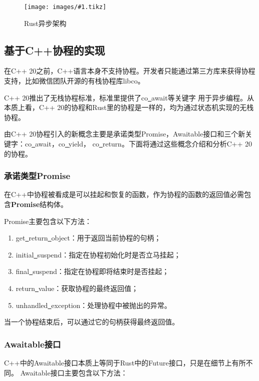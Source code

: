 \documentclass[supercite]{HustGraduPaper}
\newcommand{\cfig}[3]{
  \begin{figure}[htb]
    \centering
    \texttt{[image: images/\#1.tikz]}
    \caption{#3}
    \label{fig:#1}
  \end{figure}
}
\theoremstyle{definition}
\begin{document}
\cfig{rust-async}{0.9}{Rust异步架构}

\subsection{基于C++协程的实现}
在C++ 20之前，C++语言本身不支持协程。开发者只能通过第三方库来获得协程支持，比如微信团队开源的有栈协程库libco。\par

C++ 20推出了无栈协程标准，标准里提供了co\underline{~}await等关键字
用于异步编程。从本质上看，C++ 20的协程和Rust里的协程是一样的，均为通过状态机实现的无栈协程。\par

由C++ 20协程引入的新概念主要是承诺类型Promise，Awaitable接口和三个新关键字：co\underline{~}await，co\underline{~}yield，
co\underline{~}return。下面将通过这些概念介绍和分析C++ 20的协程。\par

\subsubsection{承诺类型Promise}

在C++中协程被看成是可以挂起和恢复的函数，作为协程的函数的返回值必需包含\textbf{Promise}结构体。\par

Promise主要包含以下方法：

\begin{enumerate}[label={(\arabic*)}]
  \item get\underline{~}return\underline{~}object：用于返回当前协程的句柄；
  \item initial\underline{~}suspend：指定在协程初始化时是否立马挂起；
  \item final\underline{~}suspend：指定在协程即将结束时是否挂起；
  \item return\underline{~}value：获取协程的最终返回值；
  \item unhandled\underline{~}exception：处理协程中被抛出的异常。
\end{enumerate}

当一个协程结束后，可以通过它的句柄获得最终返回值。\par

\subsubsection{Awaitable接口}

C++中的Awaitable接口本质上等同于Rust中的Future接口，只是在细节上有所不同。
Awaitable接口主要包含以下方法：
\end{document}
